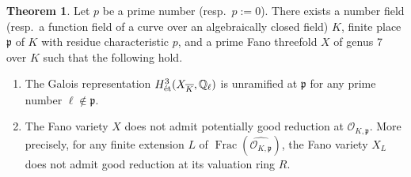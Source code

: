 \documentclass[autodetect-engine, a4paper]{amsart}
\theoremstyle{definition}
\newtheorem{thm}{Theorem}[section]
\def\p{{\mathfrak p}}
\def\Q{{\mathbb Q}}
\def\cO{\mathcal{O}}
\DeclareMathOperator\Frac{\mathrm{Frac}}
\def\et{\mathop{\text{\rm \'et}}}
\begin{document}
\begin{thm}
\label{thm:grcounterexample}
Let $p$ be a prime number (resp.\ $p:=0$).
There exists a number field (resp.\ a function field of a curve over an algebraically closed field) $K$, finite place $\p$ of $K$ with residue characteristic $p$, and a prime Fano threefold $X$ of genus $7$ over $K$ such that the following hold.
\begin{enumerate}
\item 
The Galois representation $H^3_{\et} (X_{\overline{K}}, \Q_{\ell})$ is unramified at $\p$ for any prime number $\ell \notin \p$.
\item 
The Fano variety $X$ does not admit potentially good reduction at $\cO_{K, \p}$.
More precisely, for any finite extension $L$ of $\Frac (\widehat{\cO_{K, \p}})$, the Fano variety $X_{L}$ does not admit good reduction at its valuation ring $R$.
\end{enumerate}
\end{thm}
\end{document}
